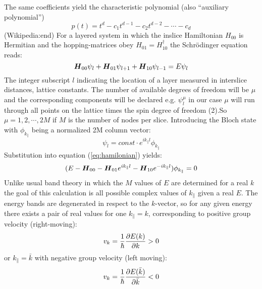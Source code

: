 The same coefficients yield the characteristic polynomial (also ``auxiliary polynomial'')
\begin{equation}
	p(t)= t^d - c_1t^{d-1} - c_2t^{d-2}-\cdots-c_{d}
	\label{eq:charactersitic_polynomial}
\end{equation}
(Wikipedia:end)
For a layered system in which the inslice Hamiltonian $H_{00}$ is Hermitian and the hopping-matrices obey $H_{01}=H_{10}^{\dagger}$ the Schr\"odinger equation
reads:
\begin{equation}
	\boldsymbol{H}_{00}\psi_{l}+\boldsymbol{H}_{01}\psi_{l+1}+\boldsymbol{H}_{10}{\psi_{l-1}} = E \psi_{l}
	\label{eq:hamilonian}
\end{equation}
The integer subscript $l$ indicating the location of a layer measured in interslice distances, lattice constants.
The number of available degrees of freedom will be $\mu$ and the corresponding components will be declared e.g.
$\psi_{l}^{\mu}$ in our case $\mu$ will run through all points on the lattice
times the spin degree of freedom (2).So $\mu = 1,2,\cdots,2M$ if $M$ is the number of nodes per slice.
Introducing the Bloch state with $\phi_{k_{\|}}$ being a normalized 2M column vector:
\begin{equation}
	\psi_{l}=const \cdot e^{ik_{\|}l} \phi_{k_{\|}}
	\label{eq:blochstate}
\end{equation}
Substitution into equation (\ref{eq:hamilonian}) yields:
\begin{equation}
	(E-\boldsymbol{H}_{00}-\boldsymbol{H}_{01}e^{ik_{\|}l}-\boldsymbol{H}_{10}e^{-ik_{\|}l})\phi_{k_{\|}} = 0
	\label{eq:substhamilonian}
\end{equation}
Unlike usual band theory in which the $M$ values of $E$ are determined for a real $k$ the goal of this calculation is all possible complex values of $k_{\|}$ given a real $E$.
The energy bands are degenerated in respect to the $k$-vector, so for any given energy there exists a pair of real values for one $k_{\|}=k$, corresponding to positive group velocity (right-moving):
\begin{equation}
	v_{k}=\frac{1}{\hbar}\frac{\partial E(k)}{\partial k} > 0
	\label{posgroupvelocity}
\end{equation}
or $k_{\|}=\bar{k}$ with negative group velocity (left moving)\cite{PhysRevB.59.11936}:
\begin{equation}
	v_{k}=\frac{1}{\hbar}\frac{\partial E(\bar{k})}{\partial \bar{k}} < 0
	\label{neggroupvelocity}
\end{equation}


